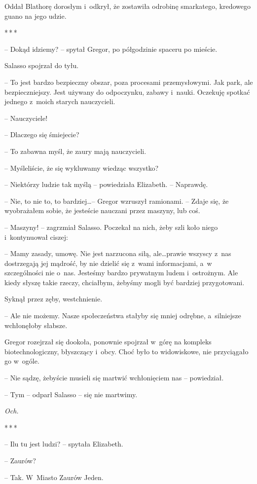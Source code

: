 \documentclass[oneside,polish,12pt,sfheadings]{mwbk}
\newcommand{\threeast}{\bigskip\par\centerline{*\,*\,*}\medskip\par}%
\begin{document}
Oddał Blathorę dorosłym i~odkrył, że zostawiła odrobinę smarkatego,
kredowego guano na jego udzie.

\threeast

-- Dokąd idziemy? -- spytał Gregor, po półgodzinie spaceru po mieście.

Salasso spojrzał do tyłu.

-- To jest bardzo bezpieczny obszar, poza procesami przemysłowymi. Jak
park, ale bezpieczniejszy. Jest używany do odpoczynku, zabawy i~nauki.
Oczekuję spotkać jednego z~moich starych nauczycieli.

-- Nauczyciele!

-- Dlaczego się śmiejecie?

-- To zabawna myśl, że zaury mają nauczycieli.

-- Myśleliście, że się wykluwamy wiedząc wszystko?

-- Niektórzy ludzie tak myślą -- powiedziała Elizabeth. -- Naprawdę.

-- Nie, to nie to, to bardziej\ldots -- Gregor wzruszył ramionami. -- Zdaje
się, że wyobrażałem sobie, że jesteście nauczani przez maszyny, lub coś.

-- Maszyny! -- zagrzmiał Salasso. Poczekał na nich, żeby szli koło niego i~kontynuował ciszej:

-- Mamy zasady, umowę. Nie jest narzucona siłą, ale\ldots prawie wszyscy z~nas dostrzegają jej mądrość, by nie dzielić się z~wami informacjami, a~w
szczególności nie o~nas. Jesteśmy bardzo prywatnym ludem i~ostrożnym.
Ale kiedy słyszę takie rzeczy, chciałbym, żebyśmy mogli być bardziej
przygotowani.

Syknął przez zęby, westchnienie. 

-- Ale nie możemy. Nasze społeczeństwa
stałyby się mniej odrębne, a~silniejsze wchłonęłoby słabsze.

Gregor rozejrzał się dookoła, ponownie spojrzał w~górę na kompleks
biotechnologiczny, błyszczący i~obcy. Choć było to widowiskowe, nie
przyciągało go w~ogóle.

-- Nie sądzę, żebyście musieli się martwić wchłonięciem nas -- powiedział.

-- Tym -- odparł Salasso -- się nie martwimy.

\emph{Och.}

\threeast

-- Ilu tu jest ludzi? -- spytała Elizabeth.

-- Zaurów?

-- Tak. W~Miasto Zaurów Jeden.
\end{document}
